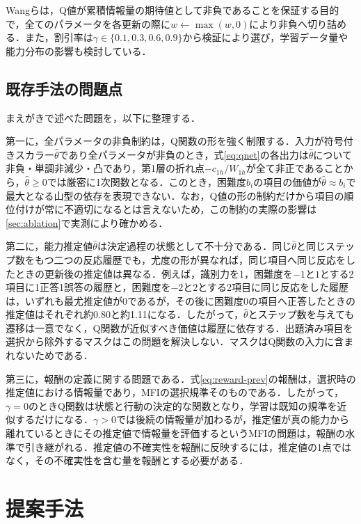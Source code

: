 \documentclass[paper]{ieicej}
\begin{document}
Wangらは，Q値が累積情報量の期待値として非負であることを保証する目的で，全てのパラメータを各更新の際に$w\leftarrow\max(w,0)$により非負へ切り詰める．また，割引率は$\gamma\in\{0.1,0.3,0.6,0.9\}$から検証により選び，学習データ量や能力分布の影響も検討している．

\subsection{既存手法の問題点}\label{sec:gap}

まえがきで述べた問題を，以下に整理する．

第一に，全パラメータの非負制約は，Q関数の形を強く制限する．入力が符号付きスカラー$\hat\theta$であり全パラメータが非負のとき，式\eqref{eq:qnet}の各出力は$\hat\theta$について非負・単調非減少・凸であり，第1層の折れ点$-c_{1h}/W_{1h}$が全て非正であることから，$\hat\theta\ge0$では厳密に1次関数となる．このとき，困難度$b_i$の項目の価値が$\hat\theta\approx b_i$で最大となる山型の依存を表現できない．なお，Q値の形の制約だけから項目の順位付けが常に不適切になるとは言えないため，この制約の実際の影響は\ref{sec:ablation}で実測により確かめる．

第二に，能力推定値$\hat\theta$は決定過程の状態として不十分である．同じ$\hat\theta$と同じステップ数をもつ二つの反応履歴でも，尤度の形が異なれば，同じ項目へ同じ反応をしたときの更新後の推定値は異なる．例えば，識別力を1，困難度を$-1$と$1$とする2項目に1正答1誤答の履歴と，困難度を$-2$と$2$とする2項目に同じ反応をした履歴は，いずれも最尤推定値が0であるが，その後に困難度0の項目へ正答したときの推定値はそれぞれ約0.80と約1.11になる．したがって，$\hat\theta$とステップ数を与えても遷移は一意でなく，Q関数が近似すべき価値は履歴に依存する．出題済み項目を選択から除外するマスクはこの問題を解決しない．マスクはQ関数の入力に含まれないためである．

第三に，報酬の定義に関する問題である．式\eqref{eq:reward-prev}の報酬は，選択時の推定値における情報量であり，MFIの選択規準そのものである．したがって，$\gamma=0$のときQ関数は状態と行動の決定的な関数となり，学習は既知の規準を近似するだけになる．$\gamma>0$では後続の情報量が加わるが，推定値が真の能力から離れているときにその推定値で情報量を評価するというMFIの問題は，報酬の水準で引き継がれる．推定値の不確実性を報酬に反映するには，推定値の1点ではなく，その不確実性を含む量を報酬とする必要がある．

\section{提案手法}\label{sec:prop}
\end{document}

